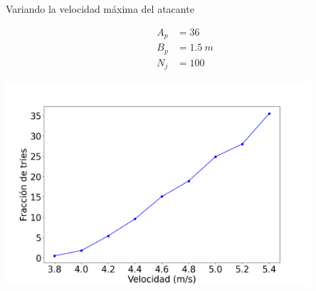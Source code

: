 \begin{frame}{Variando la velocidad máxima del atacante}
    \begin{center}
        \begin{minipage}{0.15\textwidth}
            \begin{equation*}
                \begin{aligned}
                    A_p &= 36 \\
                    B_p &= 1.5\ m \\
                    N_j &= 100
                \end{aligned}
            \end{equation*}
        \end{minipage}
        \begin{minipage}{0.80\textwidth}
            \hfill\includegraphics[width=0.85\textwidth]{pic/05-resultados/r11}
        \end{minipage}
    \end{center}
    \footnotesize{}
\end{frame}


